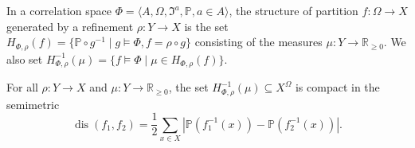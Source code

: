 \begin{definition}
	In a correlation space $\Phi = \langle A, \Omega, \mathfrak{I}^a, \mathbb{P}, a \in A \rangle$, the structure of partition $f : \Omega \rightarrow X$ generated by a refinement $\rho : Y \rightarrow X$ is the set $H_{\Phi,\rho}(f) = \{\mathbb{P} \circ g^{-1} \mid g \models \Phi, f = \rho \circ g\}$ consisting of the measures $\mu : Y \rightarrow \mathbb{R}_{\ge 0}$. We also set $H_{\Phi,\rho}^{-1}(\mu) = \{f \models \Phi \mid \mu \in H_{\Phi,\rho}(f)\}$. %
\end{definition}

\begin{lemma} \label{lemma:tyhon}
	For all $\rho : Y \rightarrow X$ and $\mu : Y \rightarrow \mathbb{R}_{\ge 0}$, the set $H_{\Phi,\rho}^{-1}(\mu) \subseteq X^{\Omega}$ is compact in the semimetric %
	\begin{equation*}
		\operatorname{dis}(f_1, f_2) = \frac{1}{2} \sum_{x \in X} \left| \mathbb{P}(f_1^{-1}(x)) - \mathbb{P}(f_2^{-1}(x)) \right|.
	\end{equation*}
\end{lemma}

